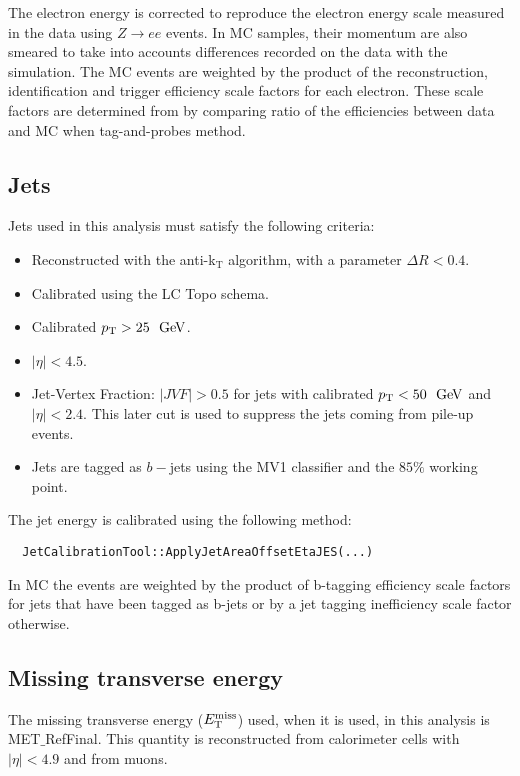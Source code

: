 The electron energy is corrected to reproduce the electron energy scale measured in the data using $Z\to{}ee$ events. In MC samples, their momentum are also smeared to take into accounts differences recorded on the data with the simulation. The MC events are weighted by the product of the reconstruction, identification and trigger efficiency scale factors for each electron. 
These scale factors are determined from by comparing ratio of the efficiencies between data and MC when tag-and-probes method.

\subsection{Jets}

Jets used in this analysis must satisfy the following criteria:

\begin{itemize}
\item Reconstructed with the anti-k$_{\mathrm{T}}$ algorithm, with a parameter $\Delta{}R<0.4$.
\item Calibrated using the LC Topo schema.	
\item Calibrated $\pt>25~\GeV$.
\item $|\eta|<4.5$.
\item Jet-Vertex Fraction: $|JVF| > 0.5$ for jets with calibrated $\pt
  < 50~\GeV$ and $|\eta| < 2.4$. This later cut is used to suppress the jets coming from pile-up events.

\item Jets are tagged as $b-$jets using the MV1 classifier and the $85\%$
  working point.
\end{itemize}

The jet energy is calibrated using the following
method: \begin{verbatim}
  JetCalibrationTool::ApplyJetAreaOffsetEtaJES(...)\end{verbatim}
  
In MC the events are weighted by the product of b-tagging efficiency scale factors for jets that have been tagged as b-jets or by a jet tagging inefficiency scale factor otherwise.

\subsection{Missing transverse energy}
The missing transverse energy ($E_{\mathrm{T}}^{\mathrm{miss}}$) used, when it is used, in this analysis is
MET$\_$RefFinal. This quantity is reconstructed from calorimeter cells with $|\eta|<4.9$ and from muons. 


